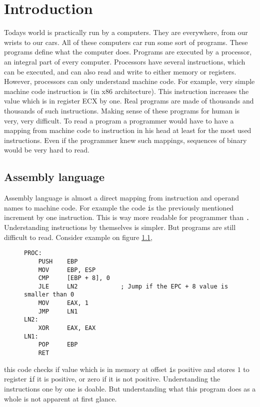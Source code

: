 \chapter{Introduction}
Todays world is practically run by a computers. They are everywhere, from our wrists to our cars.
All of these computers car run some sort of programs. These programs define what the computer does.
Programs are executed by a processor, an integral part of every computer. Processors have several instructions,
which can be executed, and can also read and write to either memory or registers. However, processors can only
understand machine code. For example, very simple machine code instruction is \texttt (in x86 architecture).
This instruction increases the value which is in register ECX by one. Real programs are made of thousands and thousands of
such instructions. Making sense of these programs for human is very, very difficult. To read a program a programmer would
have to have a mapping from machine code to instruction in his head at least for the most used instructions. Even if the
programmer knew such mappings, sequences of binary would be very hard to read. 

\section{Assembly language}
Assembly language is almost a direct mapping from instruction and operand names to machine code. For example the code \texttt
is the previously mentioned increment by one instruction. This is way more readable for programmer than \texttt.
Understanding instructions by themselves is simpler. But programs are still difficult to read. Consider example on figure \ref{fig:assembly-example},
\begin{figure}\label{fig:assembly-example}
\begin{lstlisting}
PROC:
    PUSH    EBP
    MOV     EBP, ESP
    CMP     [EBP + 8], 0
    JLE     LN2            ; Jump if the EPC + 8 value is smaller than 0
    MOV     EAX, 1
    JMP     LN1
LN2:
    XOR     EAX, EAX
LN1:
    POP     EBP
    RET
\end{lstlisting}
\end{figure}
this code checks if value which is in memory at offset \texttt is positive and stores $1$ to register \texttt if it is positive, or zero
if it is not positive. Understanding the instructions one by one is doable. But understanding what this program does as a whole is not apparent at first glance. 

